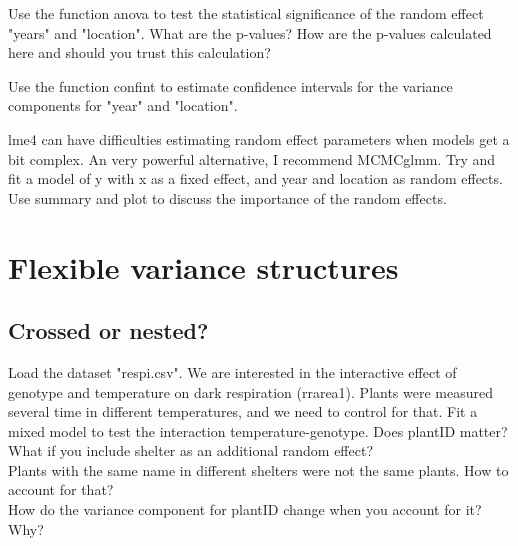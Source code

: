 \documentclass[12pt,a4paper]{scrartcl}\usepackage[]{graphicx}\usepackage[]{color}
\begin{document}
\begin{Exercise}[difficulty=2, title={Testing variance components in lme4}]
Use the function anova to test the statistical significance of the random effect "years" and "location". What are the p-values?
How are the p-values calculated here and should you trust this calculation?
\end{Exercise}

\begin{Exercise}[difficulty=1, title={CI for variance components in lme4}]
Use the function confint to estimate confidence intervals for the variance components for "year" and "location".
\end{Exercise}



\begin{Exercise}[difficulty=2, title={Testing variance components in MCMCglmm}]
lme4 can have difficulties estimating random effect parameters when models get a bit complex. An very powerful alternative, I recommend MCMCglmm. Try and fit a model of y with x as a fixed effect, and year and location as random effects. Use summary and plot to discuss the importance of the random effects.
\end{Exercise}


\section{Flexible variance structures}

\subsection{Crossed or nested?}



\begin{Exercise}[difficulty=2, title={Plants and shelters}]
Load the dataset "respi.csv". We are interested in the interactive effect of genotype and temperature on dark respiration (rrarea1). Plants were measured several time in different temperatures, and we need to control for that.
Fit a mixed model to test the interaction temperature-genotype. Does plantID matter? What if you include shelter as an additional random effect?\\
Plants with the same name in different shelters were not the same plants. How to account for that?\\
How do the variance component for plantID change when you account for it? Why?
\end{Exercise}
\end{document}
